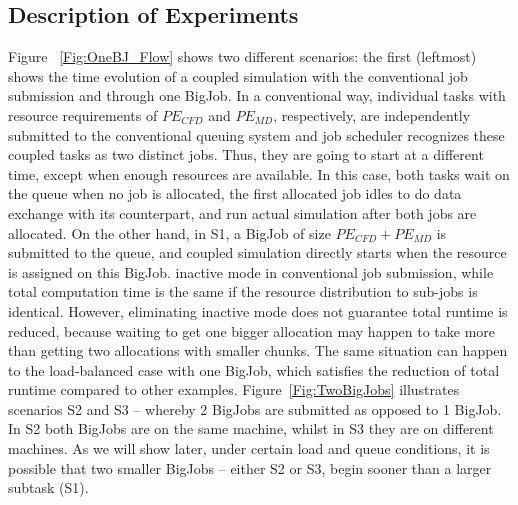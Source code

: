 \documentclass[conference,final]{IEEEtran}
\begin{document}

\subsection{Description of Experiments}

Figure ~\ref{Fig:OneBJ_Flow} shows two different scenarios: the first
(leftmost) shows the time evolution of a coupled simulation with the
conventional job submission and through one BigJob. In a conventional
way, individual tasks with resource requirements of $PE_{CFD}$ and
$PE_{MD}$, respectively, are independently submitted to the
conventional queuing system and job scheduler recognizes these coupled
tasks as two distinct jobs. Thus, they are going to start at a
different time, except when enough resources are available. In this
case, both tasks wait on the queue when no job is allocated, the first
allocated job idles to do data exchange with its counterpart, and run
actual simulation after both jobs are allocated. On the other hand, in
S1, a BigJob of size $PE_{CFD}+PE_{MD}$
is submitted to the queue, and coupled simulation directly starts when
the resource is assigned on this BigJob. 
inactive mode in
conventional job submission, while total computation time is the same if the
resource distribution to sub-jobs is identical. However, eliminating
inactive mode does not guarantee total runtime is reduced,
because waiting to get one bigger allocation may happen to take more
than getting two allocations with smaller chunks. The same situation
can happen to the load-balanced case with one BigJob, which satisfies
the reduction of total runtime compared to other examples.
Figure~\ref{Fig:TwoBigJobs} illustrates scenarios S2 and S3 -- whereby
2 BigJobs are submitted as opposed to 1 BigJob. In S2 both BigJobs are
on the same machine, whilst in S3 they are on different machines.  As
we will show later, under certain load and queue conditions, it is
possible that two smaller BigJobs -- either S2 or S3, begin sooner
than a larger subtask (S1).
\end{document}

